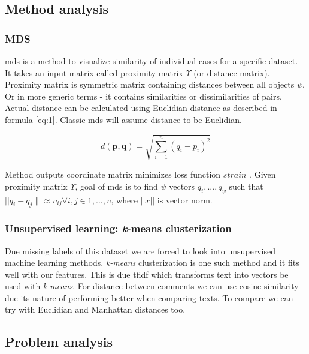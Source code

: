 \documentclass[a4paper,12pt]{article}
\begin{document}
	\clearpage
	
		\subsection{Method analysis}
	\subsubsection{MDS}
	
	\acrfull{mds} is a method to visualize similarity of individual cases for a specific dataset. It takes an input matrix called proximity matrix $\Upsilon$ (or distance matrix). Proximity matrix is symmetric matrix containing distances between all objects $\psi$. Or in more generic terms - it contains similarities or dissimilarities of pairs. Actual distance can be calculated using Euclidian distance as described in formula \ref{eq:1}. Classic \acrshort{mds} will assume distance to be Euclidian.
	\begin{center}
		\begin{equation}\label{eq:1}
		d(\mathbf{p},\mathbf{q}) = \sqrt{\sum_{i=1}^n (q_i-p_i)^2}
		\end{equation}
	\end{center} 
	
	 Method outputs coordinate matrix minimizes loss function $strain$ \cite{BorgGroenen2005}. Given proximity matrix $\Upsilon$, goal of \acrshort{mds} is to find $\psi$ vectors $q_i,...,q_\psi$ such that $||q_i - q_j\| \approx \upsilon_{ij} \forall i,j \in 1,...,\upsilon$, where $||x||$ is vector norm. 
	
	
	\subsubsection{Unsupervised learning: {\textit k-means} clusterization }
	
	Due missing labels of this dataset we are forced to look into unsupervised machine learning methods. \textit{k-means} clusterization \cite{clusterization} is one such method and it fits well with our features. This is due \acrshort{tfidf} which transforms text into vectors be used with \textit{k-means}.
	For distance between comments we can use cosine similarity \cite{cosine_similarity} due its nature of performing better when comparing texts. To compare we can try with Euclidian and Manhattan distances too.
	
	\clearpage
	 
 	 
 	\subsection{Problem analysis}
 	
\end{document}
